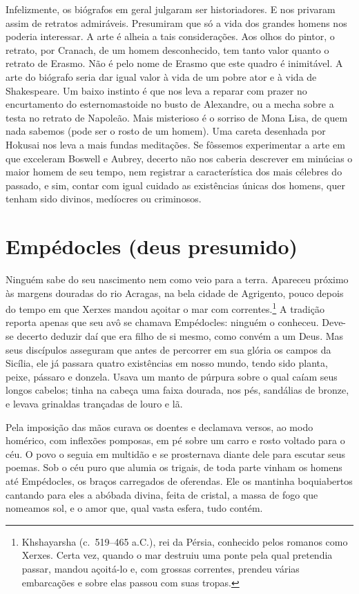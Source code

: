 Infelizmente, os biógrafos em geral julgaram ser historiadores. E
nos privaram assim de retratos admiráveis. Presumiram que só a vida dos
grandes homens nos poderia interessar. A arte é alheia a tais
considerações. Aos olhos do pintor, o retrato, por Cranach, de um homem
desconhecido, tem tanto valor quanto o retrato de Erasmo. Não é pelo nome
de Erasmo que este quadro é inimitável. A arte do biógrafo seria dar igual
valor à vida de um pobre ator e à vida de Shakespeare. Um baixo instinto é
que nos leva a reparar com prazer no encurtamento do esternomastoide no
busto de Alexandre, ou a mecha sobre a testa no retrato de Napoleão. Mais
misterioso é o sorriso de Mona Lisa, de quem nada sabemos (pode ser o
rosto de um homem). Uma careta desenhada por Hokusai nos leva a mais
fundas meditações. Se fôssemos experimentar a arte em que exceleram
Boswell e Aubrey, decerto não nos caberia descrever em minúcias o maior
homem de seu tempo, nem registrar a característica dos mais célebres do
passado, e sim, contar com igual cuidado as existências únicas
dos homens, quer tenham sido divinos, medíocres ou criminosos.


\chapter{Empédocles (deus presumido)}

Ninguém sabe do seu nascimento nem como veio para a terra. Apareceu próximo
às margens douradas do rio Acragas, na bela cidade de Agrigento, pouco
depois do tempo em que Xerxes mandou açoitar o mar com
correntes.\footnote{ Khshayarsha  (c.~519--465 a.C.), 
rei da Pérsia, conhecido pelos romanos como Xerxes. Certa vez,
quando o mar destruiu uma ponte pela qual pretendia passar, mandou
açoitá-lo e, com grossas correntes, prendeu várias embarcações e sobre
elas passou com suas tropas.} A tradição reporta apenas que seu
avô se chamava Empédocles: ninguém o conheceu. Deve-se decerto deduzir daí
que era filho de si mesmo, como convém a um Deus. Mas seus discípulos
asseguram que antes de percorrer em sua glória os campos da Sicília, ele
já passara quatro existências em nosso mundo, tendo sido planta, peixe,
pássaro e donzela. Usava um manto de púrpura sobre o qual caíam seus
longos cabelos; tinha na cabeça uma faixa dourada, nos pés, sandálias de
bronze, e levava grinaldas trançadas de louro e lã.

Pela imposição das mãos curava os doentes e declamava versos, ao modo
homérico, com inflexões pomposas, em pé sobre um carro e rosto voltado
para o céu. O povo o seguia em multidão e se prosternava diante dele para
escutar seus poemas. Sob o céu puro que alumia os trigais, de toda parte
vinham os homens até Empédocles, os braços carregados de oferendas. Ele os
mantinha boquiabertos cantando para eles a abóbada divina, feita de
cristal, a massa de fogo que nomeamos sol, e o amor que, qual vasta
esfera, tudo contém.

